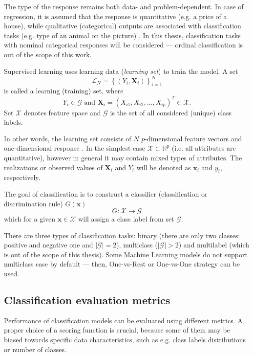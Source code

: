 \documentclass[magisterska, english]{pwr_wmat_praca_dyplomowa}
\theoremstyle{plain}
\numberwithin{theorem}{chapter}
\theoremstyle{definition}
\numberwithin{theorem}{chapter}
\newcommand{\R}{\mathbb{R}}
\begin{document}
The type of the response remains both data- and problem-dependent. In case of regression, it is assumed that the response is quantitative (e.g. a price of a house), while qualitative (categorical) outputs are associated with classification tasks (e.g. type of an animal on the picture) \cite{esl}. In this thesis, classification tasks with nominal categorical responses will be considered --- ordinal classification is out of the scope of this work.

Supervised learning uses learning data (\emph{learning set}) to train the model. A set
\begin{equation}
    \mathcal{L}_N = \left\{(Y_i, \mathbf{X}_i)\right\}_{i=1}^N
\end{equation}
is called a learning (training) set, where
\begin{equation}
    Y_i\in \mathcal{G} \text{   and   } \mathbf{X}_i = (X_{i1}, X_{i2}, \ldots, X_{ip})^T \in \mathcal{X}.
\end{equation}
Set $\mathcal{X}$ denotes feature space and $\mathcal{G}$ is the set of all considered (unique) class labels.

In other words, the learning set consists of $N$ $p$-dimensional feature vectors and one-dimensional response \cite{uczenie}. In the simplest case $\mathcal{X}\subset \R^p$ (i.e. all attributes are quantitative), however in general it may contain mixed types of attributes. The realizations or observed values of $\mathbf{X}_i$ and $Y_i$ will be denoted as $\mathbf{x}_i$ and $y_i$, respectively.

The goal of classification \cite{uczenie} is to construct a classifier (classification or discrimination rule) $G(\mathbf{x})$
\begin{equation}
    G\colon \mathcal{X}\to \mathcal{G}
\end{equation}
which for a given $\mathbf{x}\in\mathcal{X}$ will assign a class label from set $\mathcal{G}$.

There are three types of classification tasks: binary (there are only two classes: positive and negative one and $|\mathcal{G}|=2$), multiclass ($|\mathcal{G}|>2$) and multilabel (which is out of the scope of this thesis). Some Machine Learning models do not support multiclass case by default --- then, One-vs-Rest or One-vs-One strategy \cite{sklearn} can be used.

\subsection{Classification evaluation metrics}\label{section:metrics}
Performance of classification models can be evaluated using different metrics. A proper choice of a scoring function is crucial, because some of them may be biased towards specific data characteristics, such as e.g. class labels distributions or number of classes.
\end{document}
